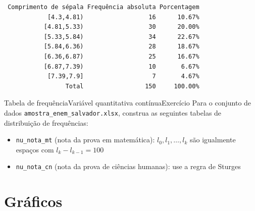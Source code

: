 \documentclass[
  10pt,
  ignorenonframetext,
]{beamer}
\providecommand{\tightlist}{%
  \setlength{\itemsep}{0pt}\setlength{\parskip}{0pt}}\usepackage{longtable,booktabs,array}
\begin{document}
\begin{frame}[fragile]
\begin{verbatim}
 Comprimento de sépala Frequência absoluta Porcentagem
            [4.3,4.81)                  16      10.67%
           [4.81,5.33)                  30      20.00%
           [5.33,5.84)                  34      22.67%
           [5.84,6.36)                  28      18.67%
           [6.36,6.87)                  25      16.67%
           [6.87,7.39)                  10       6.67%
            [7.39,7.9]                   7       4.67%
                 Total                 150     100.00%
\end{verbatim}
\end{frame}

\begin{frame}[fragile]{Tabela de frequência\newline Variável
quantitativa contínua\newline Exercício}
\protect\hypertarget{tabela-de-frequuxeanciavariuxe1vel-quantitativa-contuxednuaexercuxedcio}{}
Para o conjunto de dados \texttt{amostra\_enem\_salvador.xlsx}, construa
as seguintes tabelas de distribuição de frequências:

\begin{itemize}
\tightlist
\item
  \texttt{nu\_nota\_mt} (nota da prova em matemática):
  \(l_0, l_1, \dots, l_k\) são igualmente espaços com
  \(l_k - l_{k-1}=100\)
\item
  \texttt{nu\_nota\_cn} (nota da prova de ciências humanas): use a regra
  de Sturges
\end{itemize}
\end{frame}

\hypertarget{gruxe1ficos}{%
\section{Gráficos}\label{gruxe1ficos}}
\end{document}
